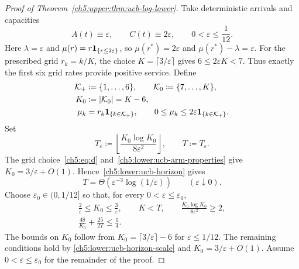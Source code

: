 \begin{proof}[Proof of Theorem~\ref{ch5:upper:thm:ucb-log-lower}]
Take deterministic arrivals and capacities
\begin{equation}
 A(t)\equiv\varepsilon,\qquad C(t)\equiv2\varepsilon,
 \qquad 0<\varepsilon\le\frac1{12}.
 \label{ch5:lower:ucb-environment}
\end{equation}
Here $\lambda=\varepsilon$ and $\mu(r)=r\mathbf{1}_{\{r\le2\varepsilon\}}$,
so $\mu(r^*)=2\varepsilon$ and $\mu(r^*)-\lambda=\varepsilon$.
For the prescribed grid $r_k=k/K$, the choice
$K=\lceil3/\varepsilon\rceil$ gives $6\le2\varepsilon K<7$.
Thus exactly the first six grid rates provide positive service.
Define
\begin{equation}
\begin{aligned}
 \mathcal K_+&\coloneqq\{1,\ldots,6\},\qquad
 \mathcal K_0\coloneqq\{7,\ldots,K\},\\
 K_0&\coloneqq|\mathcal K_0|=K-6,\\
 \mu_k&=r_k\mathbf{1}_{\{k\in\mathcal K_+\}},\qquad
 0\le\mu_k\le2\varepsilon\mathbf{1}_{\{k\in\mathcal K_+\}}.
\end{aligned}
\label{ch5:lower:ucb-arm-properties}
\end{equation}
Set
\begin{equation}
 T_\varepsilon\coloneqq
 \left\lfloor\frac{K_0\log K_0}{8\varepsilon^2}\right\rfloor,
 \qquad T\coloneqq T_\varepsilon.
 \label{ch5:lower:ucb-horizon}
\end{equation}
The grid choice~\eqref{ch5:eq:d} and~\eqref{ch5:lower:ucb-arm-properties}
give $K_0=3/\varepsilon+O(1)$. Hence~\eqref{ch5:lower:ucb-horizon} gives
\begin{equation}
 T=\Theta\!\left(\varepsilon^{-3}\log(1/\varepsilon)\right)
 \qquad(\varepsilon\downarrow0).
 \label{ch5:lower:ucb-horizon-scale}
\end{equation}
Choose $\varepsilon_0\in(0,1/12]$ so that, for every
$0<\varepsilon\le\varepsilon_0$,
\begin{equation}
\begin{gathered}
 \frac2\varepsilon\le K_0\le\frac3\varepsilon,\qquad K<T,\qquad
 \frac{K_0\log K_0}{8\varepsilon^2}\ge2,\\
 \frac{48}{K_0}+\frac{25}{2T}\le\frac14.
\end{gathered}
\label{ch5:lower:ucb-small-slack}
\end{equation}
The bounds on $K_0$ follow from $K_0=\lceil3/\varepsilon\rceil-6$
for $\varepsilon\le1/12$. The remaining conditions hold by
\eqref{ch5:lower:ucb-horizon-scale} and $K_0=3/\varepsilon+O(1)$.
Assume $0<\varepsilon\le\varepsilon_0$ for the remainder of the proof.


\end{proof}
